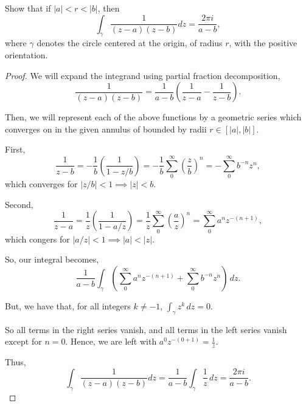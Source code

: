 \documentclass[../hw1]{subfiles}
\begin{document}
\begin{problem}
Show that if $|a| < r < |b|$, then  \[
	\int_{\gamma}\frac{1}{(z-a)(z-b)}dz = \frac{2\pi i}{a-b}
	,\] where $\gamma$ denotes the circle centered at the origin, of radius $r$, with the positive orientation.
\end{problem}
\begin{proof}
	We will expand the integrand using partial fraction decomposition, \[
		\frac{1}{(z-a)(z-b)} = \frac{1}{a-b}\left( \frac{1}{z-a}-\frac{1}{z-b} \right)
		.\]

	Then, we will represent each of the above functions by a geometric series which converges on in the given annulus of bounded by radii $r\in [|a|,|b|]$.

	First, \[
		\frac{1}{z-b} =
		-\frac{1}{b}\left( \frac{1}{1-z / b} \right) =
		-\frac{1}{b} \sum_{0}^{\infty} \left( \frac{z}{b} \right)^n =
		- \sum_{0}^{\infty} b^{-n}z^{n}
		,\] which converges for $|z / b| < 1 \implies |z| < b$.

	Second, \[
		\frac{1}{z-a} =
		\frac{1}{z}\left( \frac{1}{1- a / z} \right) =
		\frac{1}{z}\sum_{0}^{\infty} \left( \frac{a}{z} \right)^n =
		\sum_{0}^{\infty} a^n z^{-(n+1)}
		,\] which congers for $| a / z | < 1 \implies |a| < |z|$.


	So, our integral becomes, \[
		\frac{1}{a-b}\int_{\gamma} \left(
		\sum_{0}^{\infty} a^n z^{-(n+1)} +
		\sum_{0}^{\infty} b^{-n}z^{n}
		\right)  \,dz
		.\]

	But, we have that, for all integers $k\neq -1$, $\int_{\gamma} z^k \,dz=0$.

	So all terms in the right series vanish, and all terms in the left series vanish except for $n=0$.
	Hence, we are left with $a^0 z^{-(0+1)} = \frac{1}{z}$.

	Thus,  \[
		\int_{\gamma}\frac{1}{(z-a)(z-b)}dz=  \frac{1}{a-b} \int_{\gamma} \frac{1}{z} \,dz = \frac{ 2\pi i }{a-b}
		.\]
\end{proof}
\end{document}
